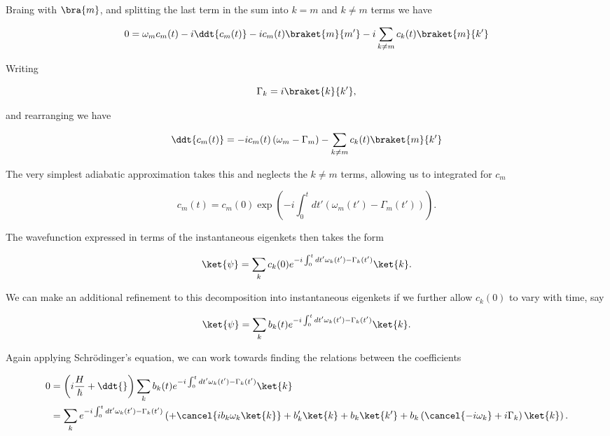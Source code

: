 Braing with $\bra{m}$, and splitting the last term in the sum into $k = m$ and $k \ne m$ terms we have

\begin{equation}\label{eqn:qmTwoExamReflection:n}
0 
=
\omega_m 
c_m(t) 
-i 
\ddt{c_m(t)} 
-i 
c_m(t) \braket{m}{m'} 
-i 
\sum_{k \ne m}
c_k(t) \braket{m}{k'} 
\end{equation}

Writing

\begin{equation}\label{eqn:qmTwoExamReflection:n}
\Gamma_k = i \braket{k}{k'},
\end{equation}

and rearranging we have

\begin{equation}\label{eqn:qmTwoExamReflection:n}
\ddt{c_m(t)} 
=
-i c_m(t) 
\left( \omega_m - \Gamma_m \right)
- 
\sum_{k \ne m}
c_k(t) \braket{m}{k'} 
\end{equation}

The very simplest adiabatic approximation takes this and neglects the $k \ne m$ terms, allowing us to integrated for $c_m$

\begin{equation}\label{eqn:qmTwoExamReflection:n}
c_m(t)
=
c_m(0) \exp\left( -i \int_0^t dt' \left( \omega_m(t') - \Gamma_m(t') \right) \right).
\end{equation}

The wavefunction expressed in terms of the instantaneous eigenkets then takes the form

\begin{equation}\label{eqn:qmTwoExamReflection:n}
\ket{\psi}
=
\sum_k c_k(0) e^{-i \int_0^t dt' \omega_k(t') - \Gamma_k(t') } \ket{k}.
\end{equation}

We can make an additional refinement to this decomposition into instantaneous eigenkets if we further allow $c_k(0)$ to vary with time, say

\begin{equation}\label{eqn:qmTwoExamReflection:n}
\ket{\psi}
=
\sum_k b_k(t) e^{-i \int_0^t dt' \omega_k(t') - \Gamma_k(t') } \ket{k}.
\end{equation}

Again applying Schr\"{o}dinger's equation, we can work towards finding the relations between the coefficients

\begin{align*}
0 
&=
\left( i\frac{H}{\hbar} + \ddt{} \right)
\sum_k b_k(t) e^{-i \int_0^t dt' \omega_k(t') - \Gamma_k(t') } \ket{k} 
\\
&=
\sum_k e^{-i \int_0^t dt' \omega_k(t') - \Gamma_k(t') } 
\left(
+ \cancel{i b_k \omega_k \ket{k} }
+ b_k' \ket{k} 
+ b_k \ket{k'} 
+ b_k \left( \cancel{-i \omega_k} +i \Gamma_k \right) \ket{k} 
\right).
\end{align*}

